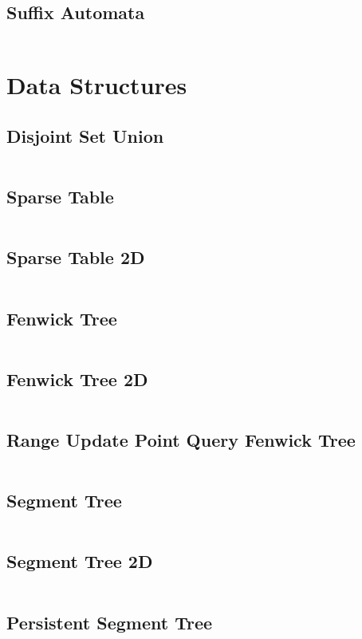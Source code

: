\documentclass[a4paper, 10pt, twocolumn, landscape]{article}
\begin{document}
  \subsection{Suffix Automata}
  \inputminted{cpp}{strings/suffix-automaton.cpp}

  \section{Data Structures}
  \subsection{Disjoint Set Union}
  \inputminted{cpp}{data-structures/dsu.cpp}
  \subsection{Sparse Table}
  \inputminted{cpp}{data-structures/sparse.cpp}
  \subsection{Sparse Table 2D}
  \inputminted{cpp}{data-structures/sparse2d.cpp}
  \subsection{Fenwick Tree}
  \inputminted{cpp}{data-structures/bit.cpp}
  \subsection{Fenwick Tree 2D}
  \inputminted{cpp}{data-structures/bit2d.cpp}
  \subsection{Range Update Point Query Fenwick Tree}
  \inputminted{cpp}{data-structures/bit-range.cpp}
  \subsection{Segment Tree}
  \inputminted{cpp}{data-structures/segtree.cpp}
  \subsection{Segment Tree 2D}
  \inputminted{cpp}{data-structures/segtree2d.cpp}
  \subsection{Persistent Segment Tree}
  \inputminted{cpp}{data-structures/persistent-segtree.cpp}
  \inputminted{cpp}{data-structures/persistent-segtree-naum.cpp}
\end{document}
